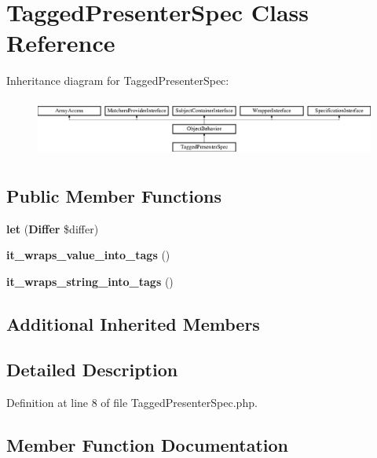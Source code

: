 \section{Tagged\+Presenter\+Spec Class Reference}
\label{classspec_1_1_php_spec_1_1_formatter_1_1_presenter_1_1_tagged_presenter_spec}
Inheritance diagram for Tagged\+Presenter\+Spec\+:\begin{figure}[H]
\begin{center}
\leavevmode
\includegraphics[height=1.953488cm]{classspec_1_1_php_spec_1_1_formatter_1_1_presenter_1_1_tagged_presenter_spec}
\end{center}
\end{figure}
\subsection*{Public Member Functions}
\begin{DoxyCompactItemize}
\item 
{\bf let} ({\bf Differ} \$differ)
\item 
{\bf it\+\_\+wraps\+\_\+value\+\_\+into\+\_\+tags} ()
\item 
{\bf it\+\_\+wraps\+\_\+string\+\_\+into\+\_\+tags} ()
\end{DoxyCompactItemize}
\subsection*{Additional Inherited Members}


\subsection{Detailed Description}


Definition at line 8 of file Tagged\+Presenter\+Spec.\+php.



\subsection{Member Function Documentation}
